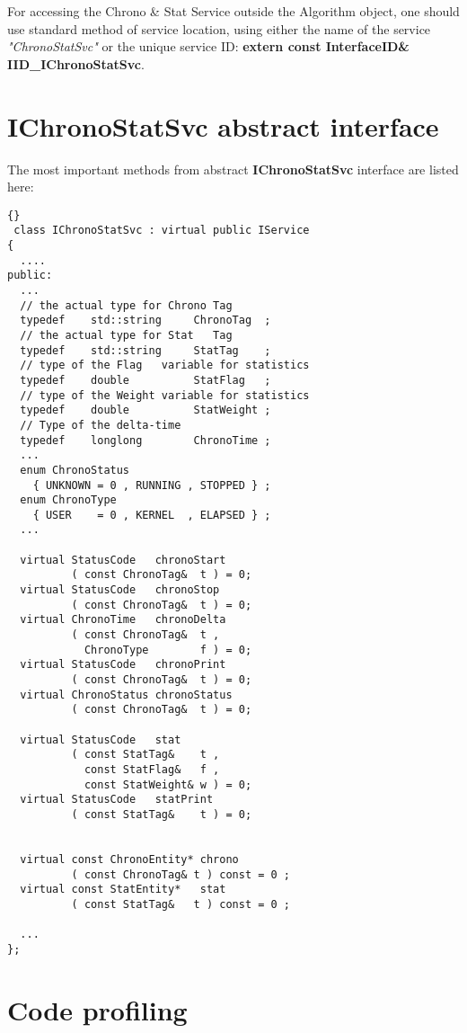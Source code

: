 \documentclass{lhcbnote}
\newcommand{\bftt}         {\ttfamily\bfseries}
\renewcommand{\it}         {\itshape}
\begin{document}
For accessing the Chrono \& Stat Service outside the Algorithm 
object, one should use standard method of service location, using 
either the name of the service {\it "ChronoStatSvc"} or the unique
service ID: {\bftt{ extern const InterfaceID\& IID\_IChronoStatSvc}}. 

\section{{\bftt{IChronoStatSvc}} abstract interface}

The most important methods from abstract
{\bftt{IChronoStatSvc}} interface are listed here:
 
\begin{lstlisting}{}
 class IChronoStatSvc : virtual public IService  
{  
  ....
public:
  ...
  // the actual type for Chrono Tag 
  typedef    std::string     ChronoTag  ;
  // the actual type for Stat   Tag 
  typedef    std::string     StatTag    ;
  // type of the Flag   variable for statistics
  typedef    double          StatFlag   ; 
  // type of the Weight variable for statistics 
  typedef    double          StatWeight ;  
  // Type of the delta-time
  typedef    longlong        ChronoTime ;  
  ... 
  enum ChronoStatus
    { UNKNOWN = 0 , RUNNING , STOPPED } ;
  enum ChronoType 
    { USER    = 0 , KERNEL  , ELAPSED } ;
  ... 

  virtual StatusCode   chronoStart  
          ( const ChronoTag&  t ) = 0;
  virtual StatusCode   chronoStop   
          ( const ChronoTag&  t ) = 0;
  virtual ChronoTime   chronoDelta  
          ( const ChronoTag&  t , 
            ChronoType        f ) = 0;
  virtual StatusCode   chronoPrint  
          ( const ChronoTag&  t ) = 0; 
  virtual ChronoStatus chronoStatus 
          ( const ChronoTag&  t ) = 0;
  
  virtual StatusCode   stat         
          ( const StatTag&    t , 
            const StatFlag&   f , 
            const StatWeight& w ) = 0;
  virtual StatusCode   statPrint    
          ( const StatTag&    t ) = 0;


  virtual const ChronoEntity* chrono 
          ( const ChronoTag& t ) const = 0 ;
  virtual const StatEntity*   stat   
          ( const StatTag&   t ) const = 0 ;

  ...
};
\end{lstlisting} 

\section{Code profiling} 
\end{document}
